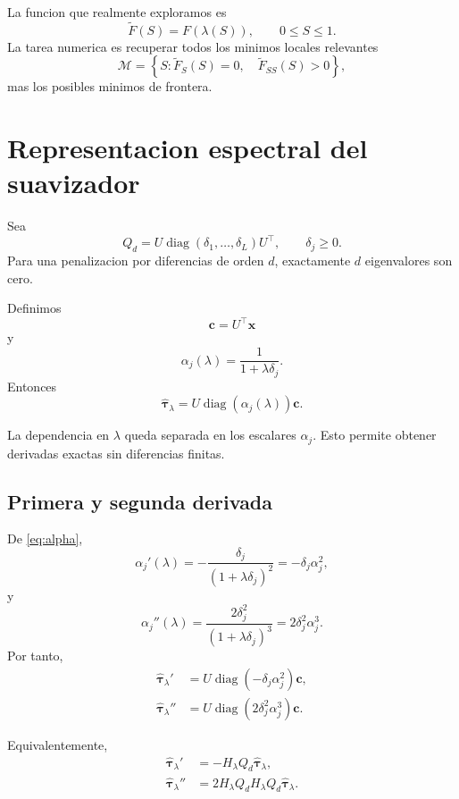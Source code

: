 \documentclass[11pt]{article}
\newcommand{\diag}{\operatorname{diag}}
\begin{document}
La funcion que realmente exploramos es
\[
\widetilde F(S)=F(\lambda(S)),
\qquad
0\le S\le1.
\]
La tarea numerica es recuperar todos los minimos locales relevantes
\[
\mathcal M
=
\left\{
S:
\widetilde F_S(S)=0,
\quad
\widetilde F_{SS}(S)>0
\right\},
\]
mas los posibles minimos de frontera.

\section{Representacion espectral del suavizador}

Sea
\[
Q_d
=
U\diag(\delta_1,\ldots,\delta_L)U^\top,
\qquad
\delta_j\ge0.
\]
Para una penalizacion por diferencias de orden \(d\), exactamente \(d\)
eigenvalores son cero.

Definimos
\[
\bm c=U^\top\bm x
\]
y
\begin{equation}
\alpha_j(\lambda)
=
\frac{1}{1+\lambda\delta_j}.
\label{eq:alpha}
\end{equation}
Entonces
\begin{equation}
\widehat{\bm\tau}_\lambda
=
U\diag(\alpha_j(\lambda))\bm c.
\label{eq:spectral-trend}
\end{equation}

La dependencia en \(\lambda\) queda separada en los escalares
\(\alpha_j\). Esto permite obtener derivadas exactas sin diferencias finitas.

\subsection{Primera y segunda derivada}

De \eqref{eq:alpha},
\[
\alpha_j'(\lambda)
=
-
\frac{\delta_j}{(1+\lambda\delta_j)^2}
=
-\delta_j\alpha_j^2,
\]
y
\[
\alpha_j''(\lambda)
=
\frac{2\delta_j^2}{(1+\lambda\delta_j)^3}
=
2\delta_j^2\alpha_j^3.
\]
Por tanto,
\begin{align}
\widehat{\bm\tau}_\lambda'
&=
U\diag(-\delta_j\alpha_j^2)\bm c,
\label{eq:trend-first}
\\
\widehat{\bm\tau}_\lambda''
&=
U\diag(2\delta_j^2\alpha_j^3)\bm c.
\label{eq:trend-second}
\end{align}

Equivalentemente,
\begin{align}
\widehat{\bm\tau}_\lambda'
&=
-H_\lambda Q_d\widehat{\bm\tau}_\lambda,
\\
\widehat{\bm\tau}_\lambda''
&=
2H_\lambda Q_dH_\lambda Q_d
\widehat{\bm\tau}_\lambda.
\end{align}
\end{document}
